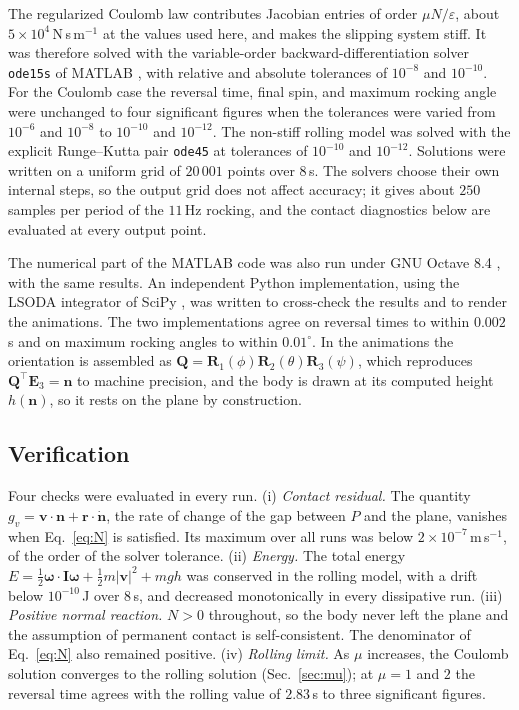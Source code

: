 \documentclass[aps,pre,twocolumn,superscriptaddress,amsmath,amssymb,floatfix,nofootinbib]{revtex4-2}
\newcommand{\rpg}{\bm{r}}
\newcommand{\ve}[1]{\bm{#1}}
\begin{document}
The regularized Coulomb law contributes Jacobian entries of order $\mu N/\varepsilon$,
about $5\times10^4$\,N\,s\,m$^{-1}$ at the values used here, and makes the slipping system
stiff. It was therefore solved with the variable-order backward-differentiation solver
\texttt{ode15s} of MATLAB \cite{Shampine1997}, with relative and absolute tolerances of
$10^{-8}$ and $10^{-10}$. For the Coulomb case the reversal time, final spin, and maximum
rocking angle were unchanged to four significant figures when the tolerances were varied
from $10^{-6}$ and $10^{-8}$ to $10^{-10}$ and $10^{-12}$. The non-stiff rolling model was solved with the explicit
Runge--Kutta pair \texttt{ode45} at tolerances of $10^{-10}$ and $10^{-12}$. Solutions
were written on a uniform grid of $20\,001$ points over $8$\,s. The solvers choose their
own internal steps, so the output grid does not affect accuracy; it gives about $250$
samples per period of the $11$\,Hz rocking, and the contact diagnostics below are
evaluated at every output point.

The numerical part of the MATLAB code was also run under GNU Octave 8.4 \cite{Eaton2023}, with the same results. An
independent Python implementation, using the LSODA integrator \cite{Petzold1983} of SciPy
\cite{Virtanen2020}, was written to cross-check the results and to render the
animations. The two implementations agree on reversal times to within $0.002$\,s and on
maximum rocking angles to within $0.01^\circ$. In the animations the orientation is
assembled as $\ve Q=\ve R_1(\phi)\ve R_2(\theta)\ve R_3(\psi)$, which reproduces
$\ve Q^{\top}\ve E_3=\ve n$ to machine precision, and the body is drawn at its computed
height $h(\ve n)$, so it rests on the plane by construction.

\subsection{Verification}\label{sec:validation}

Four checks were evaluated in every run.
(i) \emph{Contact residual.} The quantity $g_v=\ve v\cdot\ve n+\rpg\cdot\dot{\ve n}$,
the rate of change of the gap between $P$ and the plane, vanishes when Eq.~\eqref{eq:N}
is satisfied. Its maximum over all runs was below $2\times10^{-7}$\,m\,s$^{-1}$, of the order of the solver tolerance.
(ii) \emph{Energy.} The total energy
$E=\tfrac12\bm\omega\cdot\ve I\bm\omega+\tfrac12m|\ve v|^2+mgh$ was conserved in the
rolling model, with a drift below $10^{-10}$\,J over $8$\,s, and decreased monotonically
in every dissipative run.
(iii) \emph{Positive normal reaction.} $N>0$ throughout, so the body never left the plane
and the assumption of permanent contact is self-consistent. The denominator of
Eq.~\eqref{eq:N} also remained positive.
(iv) \emph{Rolling limit.} As $\mu$ increases, the Coulomb solution converges to the
rolling solution (Sec.~\ref{sec:mu}); at $\mu=1$ and $2$ the reversal time agrees with
the rolling value of $2.83$\,s to three significant figures.
\end{document}
